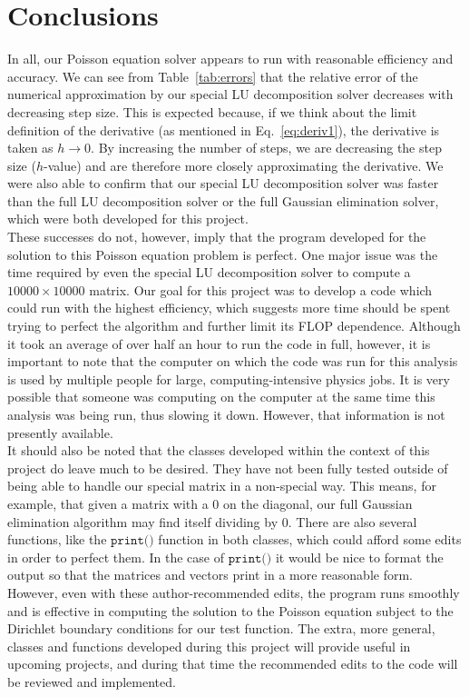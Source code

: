 \documentclass[12pt]{article}
\numberwithin{equation}{section}
\begin{document}
\section{Conclusions}
\label{sec:conclusions}

In all, our Poisson equation solver appears to run with reasonable efficiency and accuracy.  We can see from Table~\ref{tab:errors} that the relative error of the numerical approximation by our special LU decomposition solver decreases with decreasing step size.  This is expected because, if we think about the limit definition of the derivative (as mentioned in Eq.~\ref{eq:deriv1}), the derivative is taken as $h\rightarrow0$.  By increasing the number of steps, we are decreasing the step size ($h$-value) and are therefore more closely approximating the derivative.  We were also able to confirm that our special LU decomposition solver was faster than the full LU decomposition solver or the full Gaussian elimination solver, which were both developed for this project.  
\\\indent These successes do not, however, imply that the program developed for the solution to this Poisson equation problem is perfect.  One major issue was the time required by even the special LU decomposition solver to compute a $10000\times10000$ matrix.  Our goal for this project was to develop a code which could run with the highest efficiency, which suggests more time should be spent trying to perfect the algorithm and further limit its FLOP dependence.  Although it took an average of over half an hour to run the code in full, however, it is important to note that the computer on which the code was run for this analysis is used by multiple people for large, computing-intensive physics jobs.  It is very possible that someone was computing on the computer at the same time this analysis was being run, thus slowing it down.  However, that information is not presently available.
\\\indent It should also be noted that the classes developed within the context of this project do leave much to be desired.  They have not been fully tested outside of being able to handle our special matrix in a non-special way.  This means, for example, that given a matrix with a 0 on the diagonal, our full Gaussian elimination algorithm may find itself dividing by 0.  There are also several functions, like the $\texttt{print()}$ function in both classes, which could afford some edits in order to perfect them.  In the case of $\texttt{print()}$ it would be nice to format the output so that the matrices and vectors print in a more reasonable form.
\\\indent However, even with these author-recommended edits, the program runs smoothly and is effective in computing the solution to the Poisson equation subject to the Dirichlet boundary conditions for our test function.  The extra, more general, classes and functions developed during this project will provide useful in upcoming projects, and during that time the recommended edits to the code will be reviewed and implemented.
\end{document}

